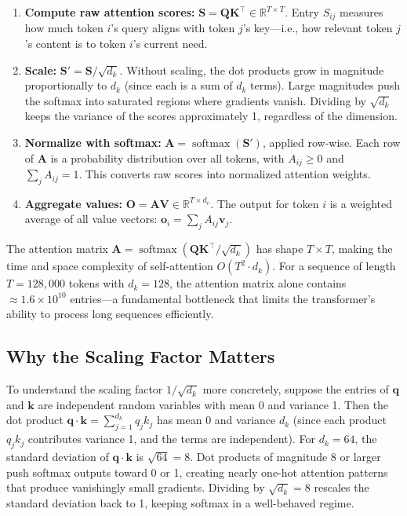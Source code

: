 \begin{enumerate}[leftmargin=1.8em]
  \item \textbf{Compute raw attention scores:} $\mathbf{S} = \mathbf{Q}\mathbf{K}^\top \in \mathbb{R}^{T \times T}$. Entry $S_{ij}$ measures how much token $i$'s query aligns with token $j$'s key---i.e., how relevant token $j$'s content is to token $i$'s current need.
  \item \textbf{Scale:} $\mathbf{S}' = \mathbf{S} / \sqrt{d_k}$. Without scaling, the dot products grow in magnitude proportionally to $d_k$ (since each is a sum of $d_k$ terms). Large magnitudes push the softmax into saturated regions where gradients vanish. Dividing by $\sqrt{d_k}$ keeps the variance of the scores approximately 1, regardless of the dimension.
  \item \textbf{Normalize with softmax:} $\mathbf{A} = \operatorname{softmax}(\mathbf{S}')$, applied row-wise. Each row of $\mathbf{A}$ is a probability distribution over all tokens, with $A_{ij} \geq 0$ and $\sum_j A_{ij} = 1$. This converts raw scores into normalized attention weights.
  \item \textbf{Aggregate values:} $\mathbf{O} = \mathbf{A}\mathbf{V} \in \mathbb{R}^{T \times d_v}$. The output for token $i$ is a weighted average of all value vectors: $\mathbf{o}_i = \sum_j A_{ij} \mathbf{v}_j$.
\end{enumerate}

\begin{dogmadef}
The attention matrix $\mathbf{A} = \operatorname{softmax}(\mathbf{Q}\mathbf{K}^\top / \sqrt{d_k})$ has shape $T \times T$, making the time and space complexity of self-attention $O(T^2 \cdot d_k)$. For a sequence of length $T = 128{,}000$ tokens with $d_k = 128$, the attention matrix alone contains $\approx 1.6 \times 10^{10}$ entries---a fundamental bottleneck that limits the transformer's ability to process long sequences efficiently.
\end{dogmadef}

\subsection{Why the Scaling Factor Matters}

To understand the scaling factor $1/\sqrt{d_k}$ more concretely, suppose the entries of $\mathbf{q}$ and $\mathbf{k}$ are independent random variables with mean 0 and variance 1. Then the dot product $\mathbf{q} \cdot \mathbf{k} = \sum_{j=1}^{d_k} q_j k_j$ has mean 0 and variance $d_k$ (since each product $q_j k_j$ contributes variance 1, and the terms are independent). For $d_k = 64$, the standard deviation of $\mathbf{q} \cdot \mathbf{k}$ is $\sqrt{64} = 8$. Dot products of magnitude 8 or larger push softmax outputs toward 0 or 1, creating nearly one-hot attention patterns that produce vanishingly small gradients. Dividing by $\sqrt{d_k} = 8$ rescales the standard deviation back to 1, keeping softmax in a well-behaved regime.

